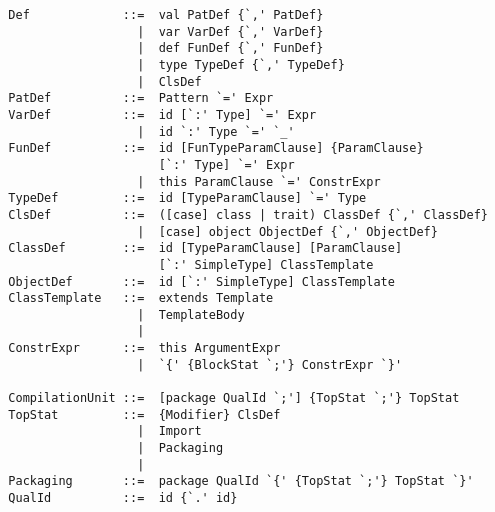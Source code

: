 \documentclass[a4paper,12pt,twoside,titlepage]{book}
\begin{document}
\begin{lstlisting}
  Def             ::=  val PatDef {`,' PatDef}
                    |  var VarDef {`,' VarDef}
                    |  def FunDef {`,' FunDef}
                    |  type TypeDef {`,' TypeDef}
                    |  ClsDef
  PatDef          ::=  Pattern `=' Expr
  VarDef          ::=  id [`:' Type] `=' Expr
                    |  id `:' Type `=' `_'
  FunDef          ::=  id [FunTypeParamClause] {ParamClause} 
                       [`:' Type] `=' Expr
                    |  this ParamClause `=' ConstrExpr
  TypeDef         ::=  id [TypeParamClause] `=' Type
  ClsDef          ::=  ([case] class | trait) ClassDef {`,' ClassDef}
                    |  [case] object ObjectDef {`,' ObjectDef}
  ClassDef        ::=  id [TypeParamClause] [ParamClause] 
                       [`:' SimpleType] ClassTemplate
  ObjectDef       ::=  id [`:' SimpleType] ClassTemplate
  ClassTemplate   ::=  extends Template
                    |  TemplateBody
                    |
  ConstrExpr      ::=  this ArgumentExpr
                    |  `{' {BlockStat `;'} ConstrExpr `}'

  CompilationUnit ::=  [package QualId `;'] {TopStat `;'} TopStat
  TopStat         ::=  {Modifier} ClsDef
                    |  Import
                    |  Packaging
                    |
  Packaging       ::=  package QualId `{' {TopStat `;'} TopStat `}'
  QualId          ::=  id {`.' id}
\end{lstlisting}
\end{document}
